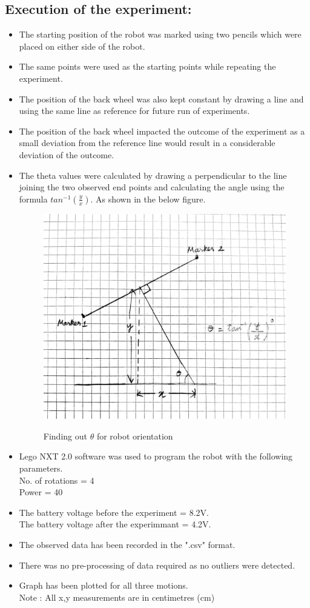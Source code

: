 \documentclass[11pt,a4paper]{article}
\begin{document}
\subsection{Execution of the experiment:}
\begin{itemize}
\item The starting position of the robot was marked using two pencils which were placed on either side of the robot.
\item The same points were used as the starting points while repeating the experiment.
\item The position of the back wheel was also kept constant by drawing a line and using the same line as reference for future run of experiments.
\item The position of the back wheel impacted the outcome of the experiment as a small deviation from the reference line would result in a considerable deviation of the outcome.

\item The theta values were calculated by drawing a perpendicular to the line joining the two observed end points and calculating the angle using the formula $tan^{-1}(\frac{y}{x})$. As shown in the below figure.
\begin{figure}[H]
\centering	
\includegraphics[width=1.2\linewidth]{theta_calc.jpeg}
\label{fig:theta_calc}
\caption{Finding out $\theta$ for robot orientation}
\end{figure}
\item Lego NXT 2.0 software was used to program the robot with the following parameters.\\
No. of rotations = 4\\ 
Power = 40
\item {The battery voltage before the experiment = 8.2V. \\ The battery voltage after the experimmant = 4.2V.}
\item The observed data has been recorded in the ".csv" format.
\item There was no pre-processing of data required as no outliers were detected.
\item Graph has been plotted for all three motions. \\
Note : All x,y measurements are in centimetres (cm)

\end{itemize}
\end{document}
